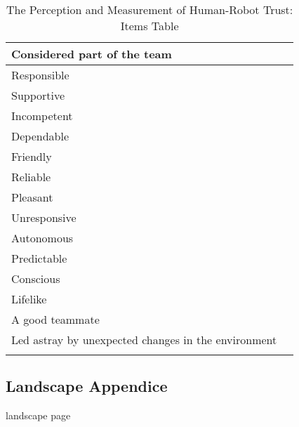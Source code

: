 \begin{longtable}{l|l}
	Considered part of the team & \\ \hline
	Responsible & \\ \hline
	Supportive & \\ \hline
	Incompetent & \\ \hline
	Dependable & \\ \hline
	Friendly & \\ \hline
	Reliable & \\ \hline
	Pleasant & \\ \hline
	Unresponsive & \\ \hline
	Autonomous & \\ \hline
	Predictable & \\ \hline
	Conscious & \\ \hline
	Lifelike & \\ \hline
	A good teammate & \\ \hline
	Led astray by unexpected changes in the environment & \\
	\caption{The Perception and Measurement of Human-Robot Trust: Items Table}
	\label{tbl:measurement.items.table}	
\end{longtable}

\newpage
\begin{landscape}
	\section{Landscape Appendice}
	\label{app:Educational}	
	landscape page
\end{landscape}

